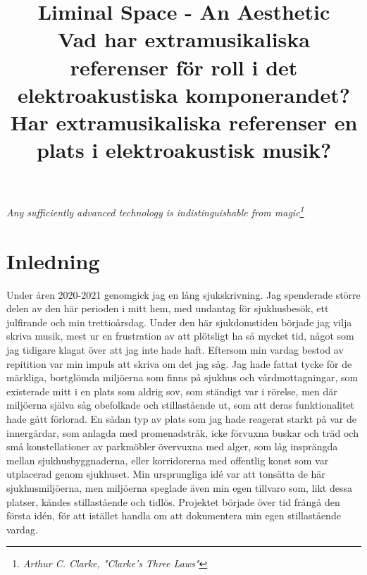 \documentclass{article}
\title{%
	Liminal Space - An Aesthetic \\
\large{Vad har extramusikaliska referenser för roll i det elektroakustiska komponerandet?}
%
\large{Har extramusikaliska referenser en plats i elektroakustisk musik?}
}
\begin{document}
\maketitle
\tableofcontents
\newpage



\begin{center}
	\hspace{0pt}
	\vfill
\emph{Any sufficiently advanced technology is indistinguishable from magic\footnote{\emph{Arthur C. Clarke, "Clarke's Three Laws"}}}
	\vfill
	\hspace{0pt}
\end{center}
\newpage




\section{Inledning}

Under åren 2020-2021 genomgick jag en lång sjukskrivning. Jag spenderade större delen av den här perioden i
mitt hem, med undantag för sjukhusbesök, ett julfirande och min trettioårsdag. Under den här sjukdomstiden
började jag vilja skriva musik, mest ur en frustration av att plötsligt ha så mycket tid, något som jag tidigare
klagat över att jag inte hade haft. Eftersom min vardag bestod av repitition var min impuls att skriva om det jag
såg. Jag hade fattat tycke för de märkliga, bortglömda miljöerna som finns på sjukhus och vårdmottagningar,
som existerade mitt i en plats som aldrig sov, som ständigt var i rörelse, men där miljöerna själva såg
obefolkade och stillastående ut, som att deras funktionalitet hade gått förlorad. En sådan typ av plats som
jag hade reagerat starkt på var de innergårdar, som anlagda med promenadstråk, icke förvuxna buskar och träd
och små konstellationer av parkmöbler övervuxna med alger, som låg insprängda mellan sjukhusbyggnaderna, eller
korridorerna med offentlig konst som var utplacerad genom sjukhuset. Min ursprungliga idé var att tonsätta de
här sjukhusmiljöerna, men miljöerna speglade även min egen tillvaro som, likt dessa platser, kändes
stillastående och tidlös. Projektet började över tid frångå den första idén, för att istället handla om att
dokumentera min egen stillastående vardag.
\end{document}
